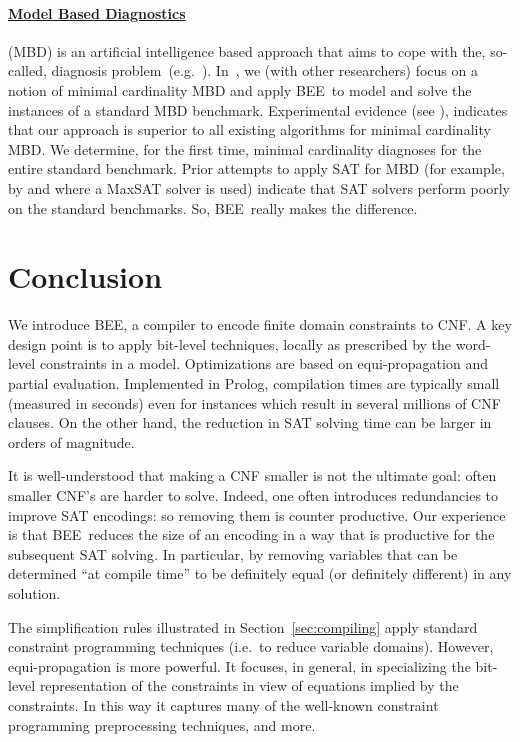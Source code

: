 \documentclass{tlp}
\newcommand{\bee}{\textsf{BEE}}
\begin{document}
\vspace{-3mm}
\paragraph{\underline{Model Based Diagnostics}}

(MBD) is an artificial intelligence based
approach that aims to cope with the, so-called, diagnosis
problem~(e.g.~\cite{Reiter87}). In~\cite{MBD}, we (with other
researchers) focus on a notion of minimal cardinality MBD and apply
\bee\ to model and solve the instances of a standard MBD benchmark.
Experimental evidence (see \cite{MBD}), indicates that our approach is
superior to all existing algorithms for minimal cardinality MBD.  We
determine, for the first time, minimal cardinality diagnoses for the
entire standard benchmark.
Prior attempts to apply SAT for MBD (for example, by 
and  where a MaxSAT solver is used) indicate that
SAT solvers perform poorly on the standard benchmarks.  So, \bee\
really makes the difference.



\section{Conclusion}

We introduce \bee, a compiler to encode finite domain constraints to
CNF. A key design point is to apply bit-level techniques, locally as
prescribed by the word-level constraints in a model.
Optimizations are based on equi-propagation and partial
evaluation.  Implemented in Prolog, compilation times are
typically small (measured in seconds) even for instances which result
in several millions of CNF clauses.  On the other hand, the reduction
in SAT solving time can be larger in orders of magnitude.

It is well-understood that making a CNF smaller is not the ultimate
goal: often smaller CNF's are harder to solve.  Indeed, one often
introduces redundancies to improve SAT encodings: so removing them is
counter productive.  Our experience is that \bee\ reduces the size of
an encoding in a way that is productive for the subsequent SAT
solving. In particular, by removing variables that can be determined
``at compile time'' to be definitely equal (or definitely different)
in any solution.


The simplification rules illustrated in Section~\ref{sec:compiling}
apply standard constraint programming techniques (i.e.~to reduce
variable domains). However, equi-propagation is more powerful. It
focuses, in general, in specializing the bit-level representation of
the constraints in view of equations implied by the constraints. In
this way it captures many of the well-known constraint programming
preprocessing techniques, and more.
\end{document}
